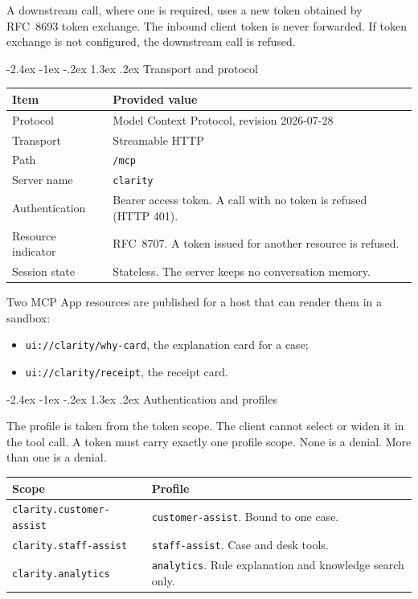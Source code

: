 \documentclass[11pt,a4paper]{article}
\makeatletter
\renewcommand\section{%
  \@startsection{section}{1}{\z@}%
    {-2.4ex \@plus -1ex \@minus -.2ex}%
    {1.3ex \@plus .2ex}%
    {\Large\sffamily\bfseries\color{hcNavy}}%
}
\newcommand{\code}[1]{\texttt{#1}}
\makeatother
\begin{document}
A downstream call, where one is required, uses a new token obtained by RFC~8693 token exchange. The inbound client token is never forwarded. If token exchange is not configured, the downstream call is refused.

\section{Transport and protocol}

\begin{center}
\small
\begin{tabularx}{\textwidth}{@{}lX@{}}
\toprule
\textbf{Item} & \textbf{Provided value} \\
\midrule
Protocol & Model Context Protocol, revision 2026-07-28 \\
Transport & Streamable HTTP \\
Path & \code{/mcp} \\
Server name & \code{clarity} \\
Authentication & Bearer access token. A call with no token is refused (HTTP 401). \\
Resource indicator & RFC~8707. A token issued for another resource is refused. \\
Session state & Stateless. The server keeps no conversation memory. \\
\bottomrule
\end{tabularx}
\end{center}

Two MCP App resources are published for a host that can render them in a sandbox:

\begin{itemize}
  \item \code{ui://clarity/why-card}, the explanation card for a case;
  \item \code{ui://clarity/receipt}, the receipt card.
\end{itemize}

\section{Authentication and profiles}

The profile is taken from the token scope. The client cannot select or widen it in the tool call. A token must carry exactly one profile scope. None is a denial. More than one is a denial.

\begin{center}
\small
\begin{tabularx}{\textwidth}{@{}lX@{}}
\toprule
\textbf{Scope} & \textbf{Profile} \\
\midrule
\code{clarity.customer-assist} & \code{customer-assist}. Bound to one case. \\
\code{clarity.staff-assist} & \code{staff-assist}. Case and desk tools. \\
\code{clarity.analytics} & \code{analytics}. Rule explanation and knowledge search only. \\
\bottomrule
\end{tabularx}
\end{center}
\end{document}
